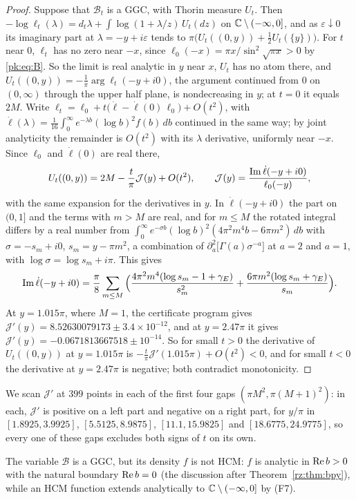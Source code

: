 \begin{proof}
Suppose that $\mathcal B_t$ is a GGC, with Thorin measure $U_t$. Then $-\log\ell_t(\lambda)=d_t\lambda+\int\log(1+\lambda/z)\,U_t(dz)$ on $\mathbb{C}\setminus(-\infty,0]$, and as $\varepsilon\downarrow0$ its imaginary part at $\lambda=-y+i\varepsilon$ tends to $\pi\big(U_t((0,y))+\frac12U_t(\{y\})\big)$. For $t$ near $0$, $\ell_t$ has no zero near $-x$, since $\ell_0(-x)=\pi x/\sin^2\sqrt{\pi x}>0$ by \eqref{pk:eq:B}. So the limit is real analytic in $y$ near $x$, $U_t$ has no atom there, and $U_t((0,y))=-\frac1\pi\arg\ell_t(-y+i0)$, the argument continued from $0$ on $(0,\infty)$ through the upper half plane, is nondecreasing in $y$; at $t=0$ it equals $2M$. Write $\ell_t=\ell_0+t\big(\dot\ell-\dot\ell(0)\,\ell_0\big)+O(t^2)$, with $\dot\ell(\lambda)=\frac1{16}\int_0^\infty e^{-\lambda b}(\log b)^2f(b)\,db$ continued in the same way; by joint analyticity the remainder is $O(t^2)$ with its $\lambda$ derivative, uniformly near $-x$. Since $\ell_0$ and $\dot\ell(0)$ are real there,
\[
U_t((0,y))=2M-\frac t\pi \mathcal J(y)+O(t^2),\qquad \mathcal J(y)=\frac{\operatorname{Im}\dot\ell(-y+i0)}{\ell_0(-y)},
\]
with the same expansion for the derivatives in $y$. In $\dot\ell(-y+i0)$ the part on $(0,1]$ and the terms with $m>M$ are real, and for $m\le M$ the rotated integral differs by a real number from $\int_0^\infty e^{-\sigma b}(\log b)^2(4\pi^2m^4b-6\pi m^2)\,db$ with $\sigma=-s_m+i0$, $s_m=y-\pi m^2$, a combination of $\partial_a^2\big[\Gamma(a)\sigma^{-a}\big]$ at $a=2$ and $a=1$, with $\log\sigma=\log s_m+i\pi$. This gives
\[
\operatorname{Im}\dot\ell(-y+i0)=\frac\pi8\sum_{m\le M}\Big(\frac{4\pi^2m^4(\log s_m-1+\gamma_E)}{s_m^2}+\frac{6\pi m^2(\log s_m+\gamma_E)}{s_m}\Big).
\]
At $y=1.015\pi$, where $M=1$, the certificate program gives $\mathcal J'(y)=8.52630079173\pm3.4\times10^{-12}$, and at $y=2.47\pi$ it gives $\mathcal J'(y)=-0.0671813667518\pm10^{-14}$. So for small $t>0$ the derivative of $U_t((0,y))$ at $y=1.015\pi$ is $-\frac t\pi \mathcal J'(1.015\pi)+O(t^2)<0$, and for small $t<0$ the derivative at $y=2.47\pi$ is negative; both contradict monotonicity.
\end{proof}

We scan $\mathcal J'$ at $399$ points in each of the first four gaps $(\pi M^2,\pi(M+1)^2)$: in each, $\mathcal J'$ is positive on a left part and negative on a right part, for $y/\pi$ in $[1.8925,3.9925]$, $[5.5125,8.9875]$, $[11.1,15.9825]$ and $[18.6775,24.9775]$, so every one of these gaps excludes both signs of $t$ on its own.

\begin{remark}\label{pk:rem:Bhcm}
The variable $\mathcal B$ is a GGC, but its density $f$ is not HCM: $f$ is analytic in $\operatorname{Re} b>0$ with the natural boundary $\operatorname{Re} b=0$ (the discussion after Theorem~\ref{rz:thm:bpy}), while an HCM function extends analytically to $\mathbb{C}\setminus(-\infty,0]$ by (F7).
\end{remark}

